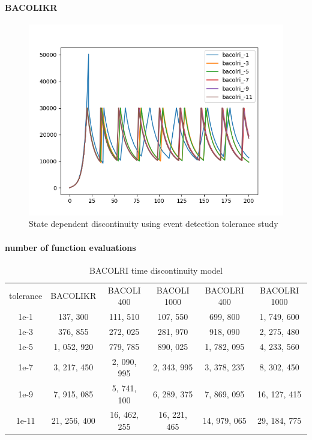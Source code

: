\documentclass{article}
\begin{document}
\paragraph{BACOLIKR}
\begin{figure}[H]
\centering
\includegraphics[width=0.7\linewidth]{./figures/pde_state_disc_tol_event}
\caption{State dependent discontinuity using event detection tolerance study}
\label{fig:pde_state_disc_tol_event}
\end{figure}

\paragraph{number of function evaluations}

\begin{table}[h]
\caption {BACOLRI time discontinuity model} 
\label{tab:BACOLRI_time_tolerance}
\begin{center}
\begin{tabular}{ c c c c c c } 
tolerance  & BACOLIKR     & BACOLI 400     & BACOLI 1000  & BACOLRI 400  & BACOLRI 1000\\ 
1e-1       & 137, 300     &   111, 510     & 107, 550     & 699, 800     & 1, 749, 600  \\
1e-3       & 376, 855     &   272, 025     & 281, 970     & 918, 090     & 2, 275, 480  \\
1e-5       & 1, 052, 920  &   779, 785     & 890, 025     & 1, 782, 095  & 4, 233, 560 \\
1e-7       & 3, 217, 450  &   2, 090, 995  & 2, 343, 995  & 3, 378, 235  & 8, 302, 450 \\
1e-9       & 7, 915, 085  &   5, 741, 100  & 6, 289, 375  & 7, 869, 095  & 16, 127, 415 \\
1e-11      & 21, 256, 400 &   16, 462, 255 & 16, 221, 465 & 14, 979, 065 & 29, 184, 775  \\
\end{tabular}
\end{center}
\end{table}
\end{document}
